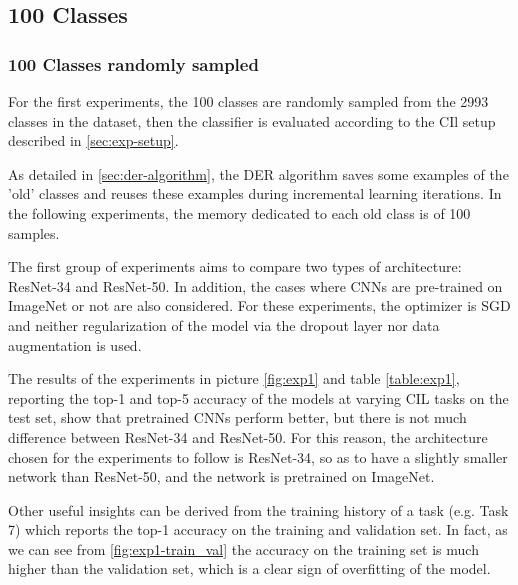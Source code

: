 \subsection{100 Classes}
\subsubsection{100 Classes randomly sampled}
For the first experiments, the 100 classes are randomly sampled from the 2993 classes in the dataset, then the classifier is evaluated according to the CIl setup described in \autoref{sec:exp-setup}. 

As detailed in \autoref{sec:der-algorithm}, the DER algorithm saves some examples of the 'old' classes and reuses these examples during incremental learning iterations. In the following experiments, the memory dedicated to each old class is of 100 samples.

The first group of experiments aims to compare two types of architecture: ResNet-34 and ResNet-50. In addition, the cases where CNNs are pre-trained on ImageNet or not are also considered. For these experiments, the optimizer is SGD and neither regularization of the model via the dropout layer nor data augmentation is used.

The results of the experiments in picture \autoref{fig:exp1} and table \autoref{table:exp1}, reporting the top-1 and top-5 accuracy of the models at varying CIL tasks on the test set, show that pretrained CNNs perform better, but there is not much difference between ResNet-34 and ResNet-50. For this reason, the architecture chosen for the experiments to follow is ResNet-34, so as to have a slightly smaller network than ResNet-50, and the network is pretrained on ImageNet.


Other useful insights can be derived from the training history of a task (e.g. Task 7) which reports the top-1 accuracy on the training and validation set. In fact, as we can see from \autoref{fig:exp1-train_val} the accuracy on the training set is much higher than the validation set, which is a clear sign of overfitting of the model.

